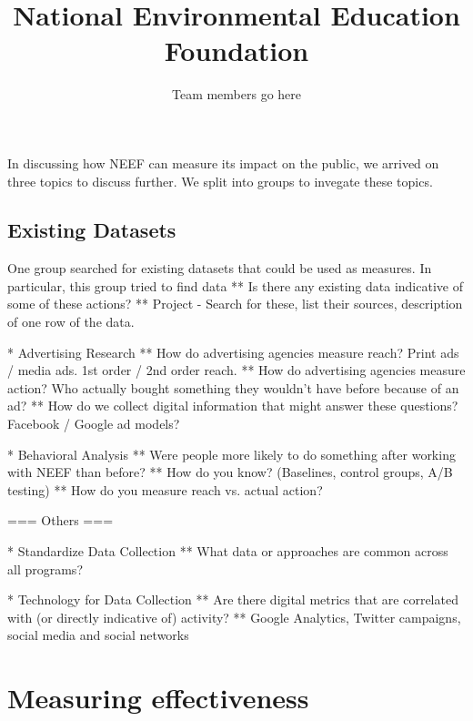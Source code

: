 \documentclass{article}
\title{National Environmental Education Foundation}
\author{Team members go here}
\begin{document}
\maketitle
{}

\section{}
In discussing how NEEF can measure its impact on the public,
we arrived on three topics to discuss further.
We split into groups to invegate these topics.

\subsection{Existing Datasets}
One group searched for existing datasets that could be used as measures.
In particular, this group tried to find data 
** Is there any existing data indicative of some of these actions?
** Project - Search for these, list their sources, description of one row of the data.

* Advertising Research
** How do advertising agencies measure reach?  Print ads / media ads.  1st order / 2nd order reach.
** How do advertising agencies measure action?  Who actually bought something they wouldn't have before because of an ad?
** How do we collect digital information that might answer these questions?  Facebook / Google ad models?

* Behavioral Analysis
** Were people more likely to do something after working with NEEF than before?
** How do you know?  (Baselines, control groups, A/B testing)
** How do you measure reach vs. actual action?

=== Others ===

* Standardize Data Collection
** What data or approaches are common across all programs?

* Technology for Data Collection
** Are there digital metrics that are correlated with (or directly indicative of) activity? 
** Google Analytics, Twitter campaigns, social media and social networks

\section{Measuring effectiveness}
\end{document}
